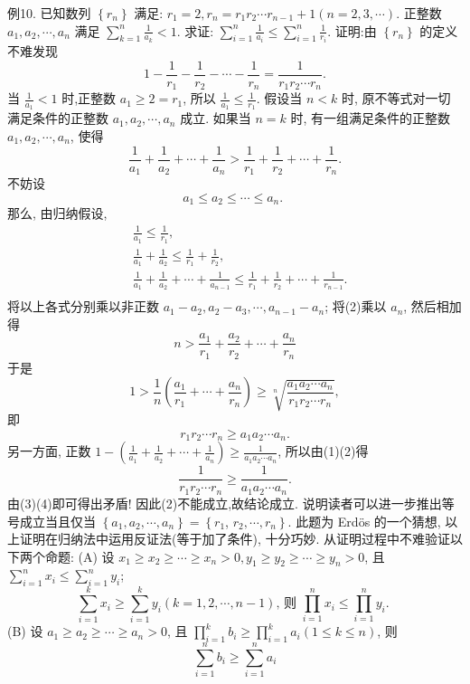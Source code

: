 例10. 已知数列 $\left\{r_n\right\}$ 满足: $r_1=2, r_n=r_1 r_2 \cdots r_{n-1}+1(n=2,3, \cdots)$. 正整数 $a_1, a_2, \cdots, a_n$ 满足 $\sum_{k=1}^n \frac{1}{a_k}<1$. 求证: $\sum_{i=1}^n \frac{1}{a_i} \leqslant \sum_{i=1}^n \frac{1}{r_i}$.
证明:由 $\left\{r_n\right\}$ 的定义不难发现
$$
1-\frac{1}{r_1}-\frac{1}{r_2}-\cdots-\frac{1}{r_n}=\frac{1}{r_1 r_2 \cdots r_n} . \label{(1)}
$$
当 $\frac{1}{a_1}<1$ 时,正整数 $a_1 \geqslant 2=r_1$, 所以 $\frac{1}{a_1} \leqslant \frac{1}{r_1}$.
假设当 $n<k$ 时, 原不等式对一切满足条件的正整数 $a_1, a_2, \cdots, a_n$ 成立.
如果当 $n=k$ 时, 有一组满足条件的正整数 $a_1, a_2, \cdots, a_n$, 使得
$$
\frac{1}{a_1}+\frac{1}{a_2}+\cdots+\frac{1}{a_n}>\frac{1}{r_1}+\frac{1}{r_2}+\cdots+\frac{1}{r_n} . \label{(2)}
$$
不妨设
$$
a_1 \leqslant a_2 \leqslant \cdots \leqslant a_n \text {. }
$$
那么, 由归纳假设,
$$
\begin{aligned}
& \frac{1}{a_1} \leqslant \frac{1}{r_1}, \\
& \frac{1}{a_1}+\frac{1}{a_2} \leqslant \frac{1}{r_1}+\frac{1}{r_2}, \\
& \frac{1}{a_1}+\frac{1}{a_2}+\cdots+\frac{1}{a_{n-1}} \leqslant \frac{1}{r_1}+\frac{1}{r_2}+\cdots+\frac{1}{r_{n-1}} . \\
&
\end{aligned}
$$
将以上各式分别乘以非正数 $a_1-a_2, a_2-a_3, \cdots, a_{n-1}-a_n$; 将(2)乘以 $a_n$, 然后相加得
$$
n>\frac{a_1}{r_1}+\frac{a_2}{r_2}+\cdots+\frac{a_n}{r_n}
$$
于是
$$
1>\frac{1}{n}\left(\frac{a_1}{r_1}+\cdots+\frac{a_n}{r_n}\right) \geqslant \sqrt[n]{\frac{a_1 a_2 \cdots a_n}{r_1 r_2 \cdots r_n}},
$$
即
$$
r_1 r_2 \cdots r_n \geqslant a_1 a_2 \cdots a_n . \label{(3)}
$$
另一方面, 正数 $1-\left(\frac{1}{a_1}+\frac{1}{a_2}+\cdots+\frac{1}{a_n}\right) \geqslant \frac{1}{a_1 a_2 \cdots a_n}$, 所以由(1)(2)得
$$
\frac{1}{r_1 r_2 \cdots r_n} \geqslant \frac{1}{a_1 a_2 \cdots a_n} . \label{(4)}
$$
由(3)(4)即可得出矛盾!
因此(2)不能成立,故结论成立.
说明读者可以进一步推出等号成立当且仅当 $\left\{a_1, a_2, \cdots, a_n\right\}=\left\{r_1\right.$, $\left.r_2, \cdots, r_n\right\}$.
此题为 Erdös 的一个猜想, 以上证明在归纳法中运用反证法(等于加了条件), 十分巧妙.
从证明过程中不难验证以下两个命题:
(A) 设 $x_1 \geqslant x_2 \geqslant \cdots \geqslant x_n>0, y_1 \geqslant y_2 \geqslant \cdots \geqslant y_n>0$, 且 $\sum_{i=1}^n x_i \leqslant \sum_{i=1}^n y_i$;
$$
\sum_{i=1}^k x_i \geqslant \sum_{i=1}^k y_i(k=1,2, \cdots, n-1) \text {, 则 } \prod_{i=1}^n x_i \leqslant \prod_{i=1}^n y_i \text {. }
$$
(B) 设 $a_1 \geqslant a_2 \geqslant \cdots \geqslant a_n>0$, 且 $\prod_{i=1}^k b_i \geqslant \prod_{i=1}^k a_i(1 \leqslant k \leqslant n)$, 则
$$
\sum_{i=1}^n b_i \geqslant \sum_{i=1}^n a_i
$$


